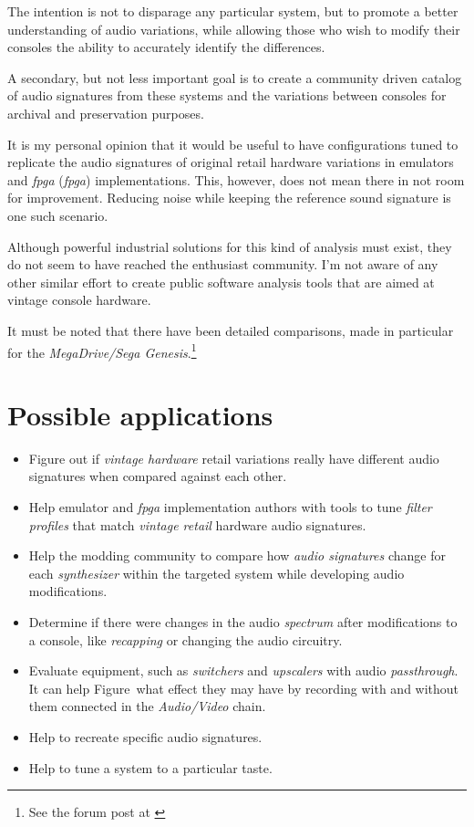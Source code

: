 \documentclass[10pt,a4paper]{report}
\newcommand{\define}[1]{\textit{\acrlong{#1}} (\textit{\acrshort{#1}})}
\newcommand{\ac}[1]{\textit{\mbox{\acrshort{#1}}}}
\begin{document}
The intention is not to disparage any particular system, but to promote a better understanding of audio variations, while allowing those who wish to modify their consoles the ability to accurately identify the differences.

A secondary, but not less important goal is to create a community driven catalog of audio signatures from these systems and the variations between consoles for archival and preservation purposes.

It is my personal opinion that it would be useful to have configurations tuned to replicate the audio signatures of original retail hardware variations in emulators and \define{fpga} implementations. This, however, does not mean there in not room for improvement. Reducing noise while keeping the reference sound signature is one such scenario.

Although powerful industrial solutions for this kind of analysis must exist, they do not seem to have reached the enthusiast community. I'm not aware of any other similar effort to create public software analysis tools that are aimed at vintage console hardware.

It must be noted that there have been detailed comparisons, made in particular for the \textit{MegaDrive/Sega Genesis}.\footnote{See the forum post at \cite{genesisaudio}}

\section{Possible applications}

\begin{itemize}
	\item Figure out if \textit{vintage hardware} retail variations really have different audio signatures when compared against each other.
	\item Help emulator and \ac{fpga} implementation authors with tools to tune \textit{filter profiles} that match \textit{vintage retail} hardware audio signatures.
	\item Help the modding community to compare how \textit{audio signatures} change for each \textit{synthesizer} within the targeted system while developing audio modifications.
	\item Determine if there were changes in the audio \textit{spectrum} after modifications to a console, like \textit{recapping} or changing the audio circuitry.
	\item Evaluate equipment, such as \textit{switchers} and \textit{upscalers} with audio \textit{passthrough}. It can help Figure~what effect they may have by recording with and without them connected in the \textit{Audio/Video} chain.
	\item Help to recreate specific audio signatures.
	\item Help to tune a system to a particular taste.
\end{itemize}
\end{document}
